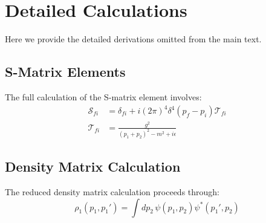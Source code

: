 \documentclass[arxiv,final,oneside,onecolumn]{../../arxiv-preprint}
\begin{document}
\appendix

\section{Detailed Calculations}
\label{app:calculations}

Here we provide the detailed derivations omitted from the main text.

\subsection{S-Matrix Elements}

The full calculation of the S-matrix element involves:
\begin{align}
\mathcal{S}_{fi} &= \delta_{fi} + i(2\pi)^4 \delta^4(p_f - p_i) \mathcal{T}_{fi} \\
\mathcal{T}_{fi} &= \frac{g^2}{(p_1 + p_2)^2 - m^2 + i\epsilon}
\end{align}

\subsection{Density Matrix Calculation}

The reduced density matrix calculation proceeds through:
\begin{equation}
\rho_1(p_1, p_1') = \int dp_2 \, \psi(p_1, p_2) \psi^*(p_1', p_2)
\end{equation}
\end{document}
